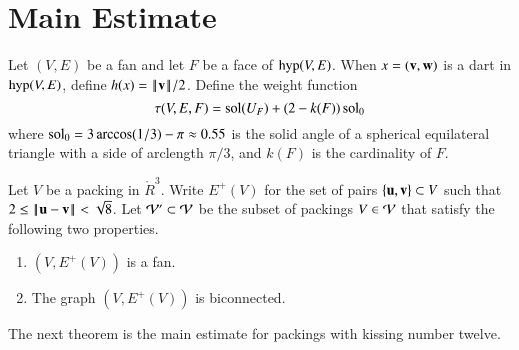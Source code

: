 \documentclass{llncs}
\def\op#1{{\hbox{#1}}}
\begin{document}
\section{Main Estimate}

Let $(V,E)$ be a fan and let $F$ be a face of $\op{hyp}(V,E)$.
When $x=({\mathbf v},{\mathbf w})$ is a dart in $\op{hyp}(V,E)$, define $h(x) = {\hbox{\ensuremath{\hspace{0.1em}|\hspace{-0.1em}|\hspace{0.1em}}}{\mathbf v}\hbox{\ensuremath{\hspace{0.1em}|\hspace{-0.1em}|\hspace{0.1em}}}}/2$.
Define the weight function
\begin{equation}
  \tau(V,E,F) 
  = \operatorname{sol}(U_F) + (2- k(F))\operatorname{sol}_0
\label{eqn:tau-sol}
\end{equation}
where $\operatorname{sol}_0=3\arccos(1/3)-\pi\approx 0.55$ is the solid angle of a
spherical equilateral triangle with a side of arclength $\pi/3$, and
$k(F)$ is the cardinality of $F$.
% 



\begin{definition}[$\CalV'$,~$E^+(V)$]
Let $V$ be a packing in $\ring{R}^3$.
  Write
$E^+(V)$ for the set of pairs $\{{\mathbf u},{\mathbf v}\}\subset V$
  such that $2\le\norm{\u}{\v} <\sqrt8$.
Let ${\mathcal V}'\subset{\mathcal V}$ be the subset of packings $V\in{\mathcal V}$ that
satisfy the following two properties. 
\begin{enumerate}
\item  $(V,E^+(V))$ is a fan.
\item The graph $(V,E^+(V))$ is biconnected.
\end{enumerate}
\end{definition}
%
%




The next theorem is the main estimate for packings with kissing number twelve.
%
\end{document}
